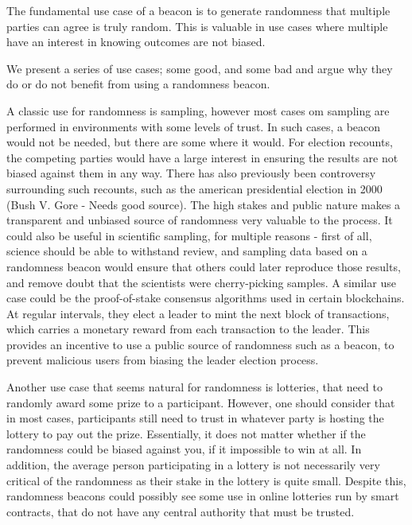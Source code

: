 The fundamental use case of a beacon is to generate randomness that multiple parties can agree is truly random. This is valuable in use cases where multiple have an interest in knowing outcomes are not biased.

We present a series of use cases; some good, and some bad and argue why they do or do not benefit from using a randomness beacon.

A classic use for randomness is sampling, however most cases om sampling are performed in environments with some levels of trust. In such cases, a beacon would not be needed, but there are some where it would. For election recounts, the competing parties would have a large interest in ensuring the results are not biased against them in any way. There has also previously been controversy surrounding such recounts, such as the american presidential election in 2000 (Bush V. Gore - Needs good source). The high stakes and public nature makes a transparent and unbiased source of randomness very valuable to the process.
It could also be useful in scientific sampling, for multiple reasons - first of all, science should be able to withstand review, and sampling data based on a randomness beacon would ensure that others could later reproduce those results, and remove doubt that the scientists were cherry-picking samples.
A similar use case could be the proof-of-stake consensus algorithms used in certain blockchains. At regular intervals, they elect a leader to mint the next block of transactions, which carries a monetary reward from each transaction to the leader. This provides an incentive to use a public source of randomness such as a beacon, to prevent malicious users from biasing the leader election process.

Another use case that seems natural for randomness is lotteries, that need to randomly award some prize to a participant. However, one should consider that in most cases, participants still need to trust in whatever party is hosting the lottery to pay out the prize. Essentially, it does not matter whether if the randomness could be biased against you, if it impossible to win at all.
In addition, the average person participating in a lottery is not necessarily very critical of the randomness as their stake in the lottery is quite small.
Despite this, randomness beacons could possibly see some use in online lotteries run by smart contracts, that do not have any central authority that must be trusted.

